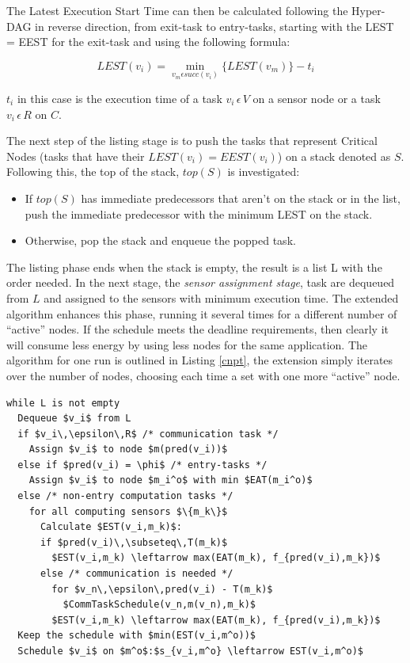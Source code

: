 The Latest Execution Start Time can then be calculated following the Hyper-DAG in reverse direction, from exit-task to entry-tasks, starting
with the LEST = EEST for the exit-task and using the following formula:

\[ LEST(v_i) = \min_{v_m \epsilon succ(v_i)} \{LEST(v_m)\} - t_i \]

$t_i$ in this case is the execution time of a task $v_i\,\epsilon\,V$ on a sensor node or a task $v_i\,\epsilon\,R$ on $C$.

The next step of the listing stage is to push the tasks that represent Critical Nodes (tasks that have their $LEST(v_i)=EEST(v_i)$) on
a stack denoted as $S$. Following this, the top of the stack, $top(S)$ is investigated:
\begin{itemize}
\item If $top(S)$ has immediate predecessors that aren't on the stack or in the list, push the immediate predecessor with the minimum
LEST on the stack.
\item Otherwise, pop the stack and enqueue the popped task.
\end{itemize}

The listing phase ends when the stack is empty, the result is a list L with the order needed. In the next stage, the \textit{sensor
assignment stage}, task are dequeued from $L$ and assigned to the sensors with minimum execution time. The extended algorithm enhances 
this phase, running it several times for a different number of ``active'' nodes. If the schedule meets the deadline requirements, then
clearly it will consume less energy by using less nodes for the same application. The algorithm for one run is outlined in Listing \ref{cnpt},
the extension simply iterates over the number of nodes, choosing each time a set with one more ``active'' node.


\lstset{numbers=left, mathescape=true, title='SingleCNPT Algorithm', nolol=false,caption=Single CNPT Algorithm,label=cnpt}
\begin{lstlisting}
while L is not empty
  Dequeue $v_i$ from L
  if $v_i\,\epsilon\,R$ /* communication task */
    Assign $v_i$ to node $m(pred(v_i))$
  else if $pred(v_i) = \phi$ /* entry-tasks */
    Assign $v_i$ to node $m_i^o$ with min $EAT(m_i^o)$
  else /* non-entry computation tasks */
    for all computing sensors $\{m_k\}$
      Calculate $EST(v_i,m_k)$:
      if $pred(v_i)\,\subseteq\,T(m_k)$
        $EST(v_i,m_k) \leftarrow max(EAT(m_k), f_{pred(v_i),m_k})$
      else /* communication is needed */
        for $v_n\,\epsilon\,pred(v_i) - T(m_k)$
          $CommTaskSchedule(v_n,m(v_n),m_k)$
        $EST(v_i,m_k) \leftarrow max(EAT(m_k), f_{pred(v_i),m_k})$
  Keep the schedule with $min(EST(v_i,m^o))$
  Schedule $v_i$ on $m^o$:$s_{v_i,m^o} \leftarrow EST(v_i,m^o)$
\end{lstlisting}



